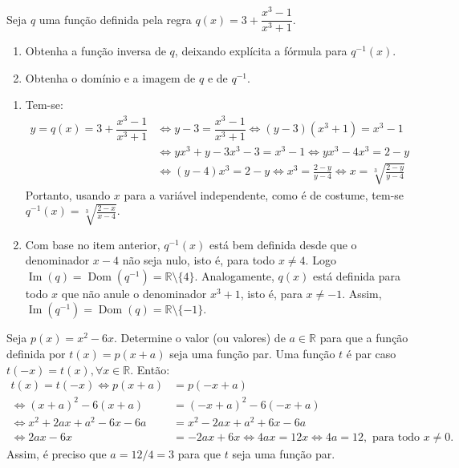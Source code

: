 \documentclass[12pt,a4paper]{article}
\newcommand*\dom[1]{\operatorname{Dom}\left(#1\right)}
\newcommand*\im[1]{\operatorname{Im}\left(#1\right)}
\newcommand*\R{\mathbb{R}}
\begin{document}
\begin{ExerciseList}
\Exercise[title={2,0}] Seja $q$ uma função definida pela regra $q(x) = 3 + \dfrac{x^3-1}{x^3+1}$.
\begin{enumerate}
\item Obtenha a função inversa de $q$, deixando explícita a fórmula para $q^{-1}(x)$.
\item Obtenha o domínio e a imagem de $q$ e de $q^{-1}$.
\end{enumerate}
\Answer
\begin{enumerate}
\item Tem-se:
\begin{align*}
y = q(x) = 3 + \dfrac{x^3-1}{x^3+1}
& \Leftrightarrow
y-3 = \dfrac{x^3-1}{x^3+1}
\Leftrightarrow
(y-3)(x^3+1) = x^3-1\\
& \Leftrightarrow
yx^3+y-3x^3-3 = x^3-1
\Leftrightarrow
yx^3-4x^3 = 2-y\\
& \Leftrightarrow
(y-4)x^3= 2-y
\Leftrightarrow
x^3= \frac{2-y}{y-4}
\Leftrightarrow
x= \sqrt[3]{ \frac{2-y}{y-4} }
\end{align*}
Portanto, usando $x$ para a variável independente, como é de costume, tem-se $q^{-1}(x) = \sqrt[3]{ \frac{2-x}{x-4} }$.
\item Com base no item anterior, $q^{-1}(x)$ está bem definida desde que o denominador $x-4$ não seja nulo, isto é, para todo $x \neq 4$. Logo $\im{q} = \dom{q^{-1}} = \R \setminus \{ 4 \}$. Analogamente, $q(x)$ está definida para todo $x$ que não anule o denominador $x^3+1$, isto é, para $x \neq -1$. Assim, $\im{q^{-1}} =\dom{q} = \R \setminus \{ -1 \}$.
\end{enumerate}

\Exercise[title={2,0}] Seja $p(x) = x^2 - 6x$. Determine o valor (ou valores) de $a \in \R$ para que a função definida por $t(x) = p(x + a)$ seja uma função par.
\Answer Uma função $t$ é par caso $t(-x) = t(x), \forall x \in \R$. Então:
\begin{align*}
t(x) = t(-x)
\Leftrightarrow
p(x+a) & = p(-x+a)\\
\Leftrightarrow
(x+a)^2 - 6(x+a) & = (-x+a)^2 - 6(-x+a)\\
\Leftrightarrow
x^2 + 2ax + a^2 - 6x - 6a & = x^2 - 2ax + a^2 + 6x - 6a \\
\Leftrightarrow
2ax - 6x & = - 2ax + 6x
\Leftrightarrow
4ax = 12x
\Leftrightarrow
4a = 12, \text{ para todo } x \neq 0.
\end{align*}
Assim, é preciso que $a = 12/4 = 3$ para que $t$ seja uma função par.


\end{ExerciseList}
\end{document}
